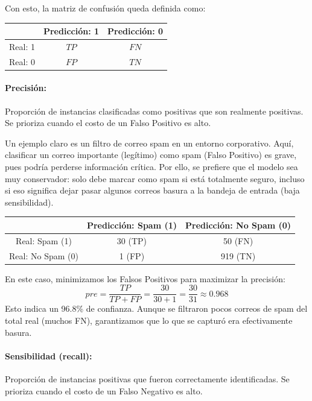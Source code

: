 \documentclass[a4,11pt]{aleph-notas}
\begin{document}
Con esto, la matriz de confusión queda definida como:
\begin{center}\small
\begin{tabular}{c|c|c}
    & Predicción: 1 & Predicción: 0 \\
    \hline
    Real: 1 & $TP$ & $FN$ \\
    \hline
    Real: 0 & $FP$ & $TN$ \\
\end{tabular}
\end{center}

\paragraph{Precisión:} Proporción de instancias clasificadas como positivas que son realmente positivas. Se prioriza cuando el costo de un Falso Positivo es alto.

Un ejemplo claro es un filtro de correo spam en un entorno corporativo. Aquí, clasificar un correo importante (legítimo) como spam (Falso Positivo) es grave, pues podría perderse información crítica. Por ello, se prefiere que el modelo sea muy conservador: solo debe marcar como spam si está totalmente seguro, incluso si eso significa dejar pasar algunos correos basura a la bandeja de entrada (baja sensibilidad).

\begin{center}\small
\begin{tabular}{c|c|c}
    & Predicción: Spam (1) & Predicción: No Spam (0) \\
    \hline
    Real: Spam (1) & 30 (TP) & 50 (FN) \\
    \hline
    Real: No Spam (0) & {1 (FP)} & 919 (TN) \\
\end{tabular}
\end{center}
En este caso, minimizamos los Falsos Positivos para maximizar la precisión:
\[pre = \frac{TP}{TP + FP} = \frac{30}{30 + 1} = \frac{30}{31} \approx 0.968\]
Esto indica un 96.8\% de confianza. Aunque se filtraron pocos correos de spam del total real (muchos FN), garantizamos que lo que se capturó era efectivamente basura.

\paragraph{Sensibilidad (recall):} Proporción de instancias positivas que fueron correctamente identificadas. Se prioriza cuando el costo de un Falso Negativo es alto.
\end{document}
